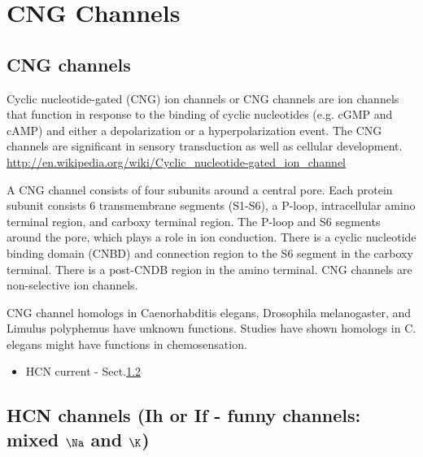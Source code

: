 \chapter{CNG Channels}
\label{chap:CNG_channel}

\section{CNG channels}
\label{sec:CNG_channel}

Cyclic nucleotide-gated  (CNG) ion channels or CNG channels are ion channels
that function in response to the binding of cyclic nucleotides (e.g. cGMP and cAMP)
and either a depolarization or a hyperpolarization event.
The CNG channels are significant in sensory transduction as well as cellular
development.
\url{http://en.wikipedia.org/wiki/Cyclic_nucleotide-gated_ion_channel}

A CNG channel consists of four subunits around a central pore. Each protein
subunit consists 6 transmembrane segments (S1-S6), a P-loop, intracellular amino
terminal region, and carboxy terminal region. The P-loop and S6 segments around
the pore, which plays a role in ion conduction. There is a cyclic nucleotide
binding domain (CNBD) and connection region to the S6 segment in the carboxy
terminal. There is a post-CNDB region in the amino terminal. CNG channels are
non-selective ion channels.

CNG channel homologs in Caenorhabditis elegans, Drosophila melanogaster, and
Limulus polyphemus have unknown functions. Studies have shown homologs in C.
elegans might have functions in chemosensation.

\begin{itemize}
  \item HCN current - Sect.\ref{sec:HCN-channels}
\end{itemize}
% 
% 

\section{HCN channels (Ih or If - funny channels: mixed $\Na$ and $\K$)}
\label{sec:HCN-channels}

